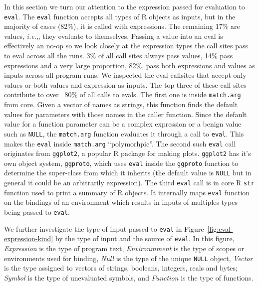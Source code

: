 \documentclass[USenglish,cleveref, autoref, thm-restate]{lipics-v2019}
\newcommand{\AllValueInputEvalCallPerc}{17\%\xspace}
\newcommand{\AllExpressionInputEvalCallPerc}{82\%\xspace}
\newcommand{\AllExpressionInputEvalSitePerc}{14\%\xspace}
\newcommand{\AllValueInputEvalSitePerc}{3\%\xspace}
\newcommand{\AllPolymorphicInputEvalSitePerc}{82\%\xspace}
\newcommand{\ie}{\emph{i.e.},\xspace}
\newcommand{\eval}{\texttt{eval}\xspace}
\newcommand{\ggproto}{\c{ggproto}}
\newcommand{\ggplot}{\c{ggplot2}}
\renewcommand{\c}[1]{\lstinline{#1}\xspace}
\begin{document}
In this section we turn our attention to the expression passed for evaluation to
\eval. The \eval function accepts all types of R objects as inputs, but in the
majority of cases (\AllExpressionInputEvalCallPerc), it is called with
expressions. The remaining \AllValueInputEvalCallPerc are values, \ie, they
evaluate to themselves.
%
Passing a value into an eval is effectively an no-op so we look closely at the
expression types the call sites pass to eval across all the runs.
\AllValueInputEvalSitePerc of all call sites always pass values,
\AllExpressionInputEvalSitePerc pass expressions and a very large proportion,
\AllPolymorphicInputEvalSitePerc, pass both expressions and values as inputs
across all program runs. We inspected the eval callsites that accept only values
or both values and expression as inputs. The top three of these call sites
contribute to over ~80\% of all calls to evals. The first one is inside
\c{match.arg} from core. Given a vector of names as strings, this function finds
the default values for parameters with those names in the caller function. Since
the default value for a function parameter can be a complex expression or a
benign value such as \c{NULL}, the \c{match.arg} function evaluates it through a
call to \eval. This makes the \eval inside \c{match.arg} ``polymorhpic''. The
second such \eval call originates from \ggplot, a popular R package for making
plots. \ggplot has it's own object system, \ggproto, which uses \eval inside the
\ggproto function to determine the super-class from which it inherits (the
default value is \c{NULL} but in general it could be an arbitrarily expression).
The third \eval call is in core R \c{str} function used to print a summary of R
objects. It internally maps \eval function on the bindings of an environment
which results in inputs of multiples types being passed to \eval.

We further investigate the type of input passed to \eval in
Figure~\ref{fig:eval-expression-kind} by the type of input and the source of
\eval. In this figure, \emph{Expression} is the type of program text,
\emph{Environmment} is the type of scopes or environments used for binding,
\emph{Null} is the type of the unique \c{NULL} object, \emph{Vector} is the
type assigned to vectors of strings, booleans, integers, reals and bytes;
\emph{Symbol} is the type of unevaluated symbols, and \emph{Function} is the
type of functions.
\end{document}

